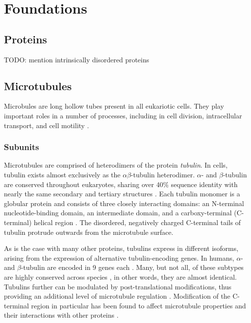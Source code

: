 \section{Foundations}
\subsection{Proteins}
\label{sec:proteins}
TODO: mention intrinsically disordered proteins

\subsection{Microtubules}
\label{sec:microtubules}
Microbules are long hollow tubes present in all eukariotic cells. They play important roles in a number of processes, including in cell division, intracellular transport, and cell motility \parencite{Akhmanova2022}.

\subsubsection{Subunits}
\label{sec:tubulin}
Microtubules are comprised of heterodimers of the protein \textit{tubulin}. In cells, tubulin exists almost exclusively as the $\alpha\beta$-tubulin heterodimer. $\alpha$- and $\beta$-tubulin are conserved throughout eukaryotes, sharing over 40\% sequence identity with nearly the same secondary and tertiary structures \parencite{DOWNING199816}. Each tubulin monomer is a globular protein and consists of three closely interacting domains: an N-terminal nucleotide-binding domain, an intermediate domain, and a carboxy-terminal (C-terminal) helical region \parencite{ALUSHIN20141117}. The disordered, negatively charged C-terminal tails of tubulin protrude outwards from the microtubule surface.\par

As is the case with many other proteins, tubulins express in different isoforms, arising from the expression of alternative tubulin-encoding genes. In humans, $\alpha$- and $\beta$-tubulin are encoded in 9 genes each . Many, but not all, of these subtypes are highly conserved across species , in other words, they are almost identical. Tubulins further can be modulated by post-translational modifications, thus providing an additional level of microtubule regulation \parencite{Janke2014}. Modification of the C-terminal region in particular has been found to affect microtubule properties and their interactions with other proteins \parencite{Janke2020}. 

